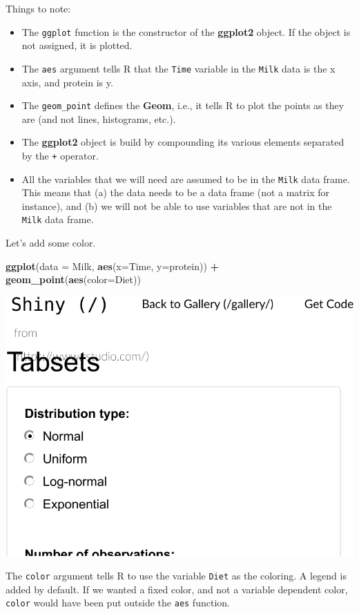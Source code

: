 \documentclass[]{book}
\newenvironment{Shaded}{\begin{snugshade}}{\end{snugshade}}
\newcommand{\KeywordTok}[1]{\textcolor[rgb]{0.13,0.29,0.53}{\textbf{#1}}}
\newcommand{\DataTypeTok}[1]{\textcolor[rgb]{0.13,0.29,0.53}{#1}}
\newcommand{\StringTok}[1]{\textcolor[rgb]{0.31,0.60,0.02}{#1}}
\newcommand{\OperatorTok}[1]{\textcolor[rgb]{0.81,0.36,0.00}{\textbf{#1}}}
\newcommand{\NormalTok}[1]{#1}
\providecommand{\tightlist}{%
  \setlength{\itemsep}{0pt}\setlength{\parskip}{0pt}}
\theoremstyle{definition}
\theoremstyle{definition}
\theoremstyle{definition}
\theoremstyle{remark}
\begin{document}
Things to note:

\begin{itemize}
\tightlist
\item
  The \texttt{ggplot} function is the constructor of the
  \textbf{ggplot2} object. If the object is not assigned, it is plotted.
\item
  The \texttt{aes} argument tells R that the \texttt{Time} variable in
  the \texttt{Milk} data is the x axis, and protein is y.
\item
  The \texttt{geom\_point} defines the \textbf{Geom}, i.e., it tells R
  to plot the points as they are (and not lines, histograms, etc.).
\item
  The \textbf{ggplot2} object is build by compounding its various
  elements separated by the \texttt{+} operator.
\item
  All the variables that we will need are assumed to be in the
  \texttt{Milk} data frame. This means that (a) the data needs to be a
  data frame (not a matrix for instance), and (b) we will not be able to
  use variables that are not in the \texttt{Milk} data frame.
\end{itemize}

Let's add some color.

\begin{Shaded}
\begin{Highlighting}[]
\KeywordTok{ggplot}\NormalTok{(}\DataTypeTok{data =}\NormalTok{ Milk, }\KeywordTok{aes}\NormalTok{(}\DataTypeTok{x=}\NormalTok{Time, }\DataTypeTok{y=}\NormalTok{protein)) }\OperatorTok{+}
\StringTok{  }\KeywordTok{geom_point}\NormalTok{(}\KeywordTok{aes}\NormalTok{(}\DataTypeTok{color=}\NormalTok{Diet))}
\end{Highlighting}
\end{Shaded}

\includegraphics[width=0.5\linewidth]{Rcourse_files/figure-latex/unnamed-chunk-266-1}

The \texttt{color} argument tells R to use the variable \texttt{Diet} as
the coloring. A legend is added by default. If we wanted a fixed color,
and not a variable dependent color, \texttt{color} would have been put
outside the \texttt{aes} function.
\end{document}
